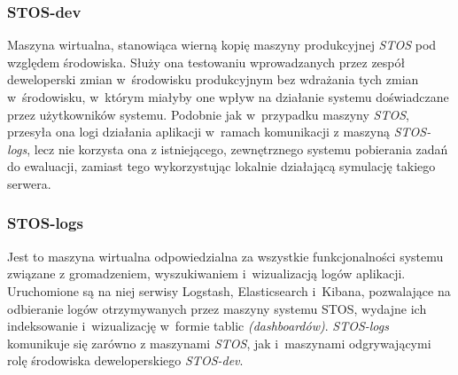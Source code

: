 \subsubsection{STOS-dev}
Maszyna wirtualna, stanowiąca wierną kopię maszyny produkcyjnej \textit{STOS} pod względem środowiska. Służy ona testowaniu wprowadzanych przez zespół deweloperski zmian w~środowisku produkcyjnym bez wdrażania tych zmian w~środowisku, w~którym miałyby one wpływ na działanie systemu doświadczane przez użytkowników systemu. Podobnie jak w~przypadku maszyny \textit{STOS}, przesyła ona logi działania aplikacji w~ramach komunikacji z maszyną \textit{STOS-logs}, lecz nie korzysta ona z istniejącego, zewnętrznego systemu pobierania zadań do ewaluacji, zamiast tego wykorzystując lokalnie działającą symulację takiego serwera.

\subsubsection{STOS-logs}
Jest to maszyna wirtualna odpowiedzialna za wszystkie funkcjonalności systemu związane z gromadzeniem, wyszukiwaniem i~wizualizacją logów aplikacji. Uruchomione są na niej serwisy Logstash, Elasticsearch i~Kibana, pozwalające na odbieranie logów otrzymywanych przez maszyny systemu STOS, wydajne ich indeksowanie i~wizualizację w~formie tablic \textit{(dashboardów)}. \textit{STOS-logs} komunikuje się zarówno z maszynami \textit{STOS}, jak i~maszynami odgrywającymi rolę środowiska deweloperskiego \textit{STOS-dev}. 


